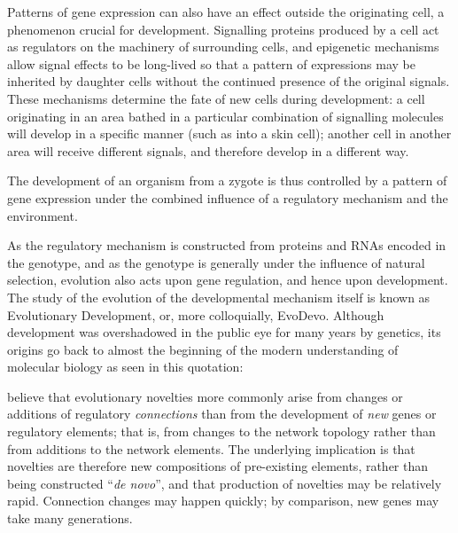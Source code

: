 Patterns of gene expression can also have an effect outside the originating cell, a phenomenon crucial for development. Signalling proteins produced by a cell act as regulators on the machinery of surrounding cells, and epigenetic mechanisms allow signal effects to be long-lived so that a pattern of expressions may be inherited by daughter cells without the continued presence of the original signals. These mechanisms determine the fate of new cells during development: a cell originating in an area bathed in a particular combination of signalling molecules will develop in a specific manner (such as into a skin cell); another cell in another area will receive different signals, and therefore develop in a different way.

The development of an organism from a zygote is thus controlled by a pattern of gene expression under the combined influence of a regulatory mechanism and the environment.

As the regulatory mechanism is constructed from proteins and RNAs encoded in the genotype, and as the genotype is generally under the influence of natural selection, evolution also acts upon gene regulation, and hence upon development. The study of the evolution of the developmental mechanism itself is known as Evolutionary Development, or, more colloquially, EvoDevo. Although development was overshadowed  in the public eye for many years by genetics, its origins go back to almost the beginning of the modern understanding of molecular biology as seen in this quotation:


\Textcite{Prudhomme:2007ax} believe that evolutionary novelties more commonly arise from changes or additions of regulatory \emph{connections} than from the development of \emph{new} genes or regulatory elements; that is, from changes to the network topology rather than from additions to the network elements. The underlying implication is that novelties are therefore new compositions of pre-existing elements, rather than being constructed ``\textit{de novo}'', and that production of novelties may be relatively rapid. Connection changes may happen quickly; by comparison, new genes may take many generations.

